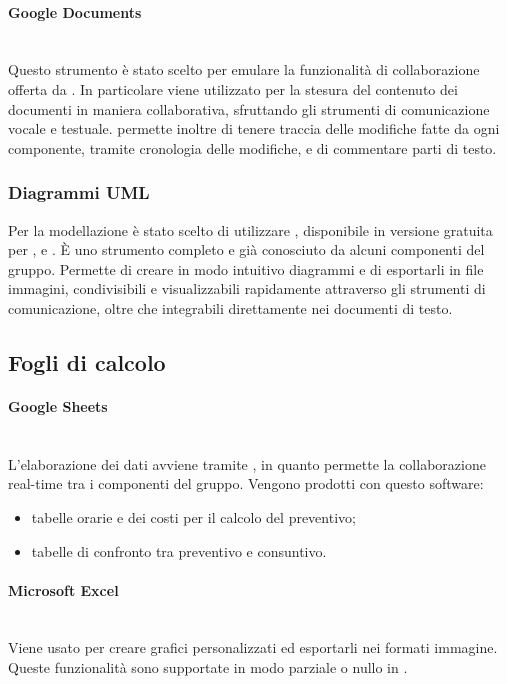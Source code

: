 \paragraph{Google Documents}\mbox{}\\
Questo strumento è stato scelto per emulare la funzionalità di collaborazione offerta da . In particolare viene utilizzato per la stesura del contenuto dei documenti in maniera collaborativa, sfruttando gli strumenti di comunicazione vocale e testuale.  permette inoltre di tenere traccia delle modifiche fatte da ogni componente, tramite cronologia delle modifiche, e di commentare parti di testo. 

\subsubsection{Diagrammi UML}
Per la modellazione  è stato scelto di utilizzare \textbf{}, disponibile in versione gratuita per ,  e . \`{E} uno strumento completo e già conosciuto da alcuni componenti del gruppo. Permette di creare in modo intuitivo diagrammi  e di esportarli in file immagini, condivisibili e visualizzabili rapidamente attraverso gli strumenti di comunicazione, oltre che integrabili direttamente nei documenti di testo.

\subsection{Fogli di calcolo} \label{sec:fogli_di_calcolo}
\paragraph{Google Sheets}\mbox{}\\
L'elaborazione dei dati avviene tramite , in quanto permette la collaborazione real-time tra i componenti del gruppo. Vengono prodotti con questo software:
	\begin{itemize}
	\item tabelle orarie e dei costi per il calcolo del preventivo;
	\item tabelle di confronto tra preventivo e consuntivo.
	\end{itemize}

\paragraph{Microsoft Excel} \mbox{}\\
Viene usato per creare grafici personalizzati ed esportarli nei formati immagine. Queste funzionalità sono supportate in modo parziale o nullo in .

